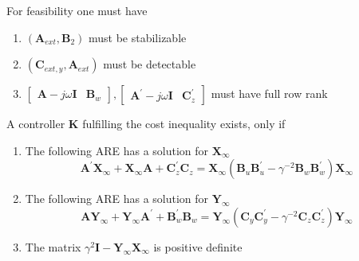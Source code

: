 For feasibility one must have
\begin{enumerate}
    \item $(\mathbf{A}_{ext}, \mathbf{B}_2)$ must be stabilizable
    \item $(\mathbf{C}_{ext, y},\mathbf{A}_{ext})$ must be detectable
    \item $\begin{bmatrix}\mathbf{A}-j\omega \mathbf{I}&\mathbf{B}_w\end{bmatrix},\begin{bmatrix}\mathbf{A}^{\prime}-j\omega \mathbf{I}&\mathbf{C}_z^{\prime}\end{bmatrix}$ must have full row rank
\end{enumerate}
\newpar{}
A controller $\mathbf{K}$ fulfilling the cost inequality exists, only if 
\begin{enumerate}
    \item The following ARE has a solution for $\mathbf{X}_{\infty}$
    \begin{equation*}
        \mathbf{A}^{\prime}\mathbf{X}_{\infty}+\mathbf{X}_{\infty}\mathbf{A}+\mathbf{C}_{z}^{\prime}\mathbf{C}_{z}=\mathbf{X}_{\infty}(\mathbf{B}_{u}\mathbf{B}_{u}^{\prime}-\gamma^{-2}\mathbf{B}_{w}\mathbf{B}_{w}^{\prime})\mathbf{X}_{\infty}
    \end{equation*}
    \item The following ARE has a solution for $\mathbf{Y}_{\infty}$
    \begin{equation*}
        \mathbf{A}\mathbf{Y}_\infty + \mathbf{Y}_\infty \mathbf{A}^{\prime} + \mathbf{B}_w^{\prime} \mathbf{B}_w = \mathbf{Y}_\infty (\mathbf{C}_y \mathbf{C}_y^{\prime} - \gamma^{-2} \mathbf{C}_z \mathbf{C}_z^{\prime}) \mathbf{Y}_\infty
    \end{equation*}
    \item The matrix $\gamma^2 \mathbf{I} - \mathbf{Y}_{\infty} \mathbf{X}_{\infty}$ is positive definite
\end{enumerate}

\newpar{}

